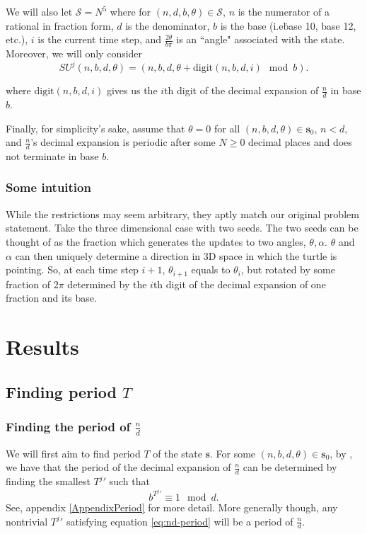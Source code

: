 \documentclass[11pt,titlepage]{article}
\newcommand{\rationalPeriod}{{T^j}'}
\begin{document}
We will also let $\mathcal{S} = N^5$ where for $(n, d, b, \theta) \in \mathcal{S}$,
$n$ is the numerator of a rational in fraction form, $d$ is the denominator, 
$b$ is the base (i.e\. base 10, base 12, etc.), $i$ is the current time step,
and $\frac{2\theta}{b \pi}$ is an ``angle" associated with the state.
Moreover, we will only consider
$$
  SU^j(n, b, d, \theta) = (n, b, d, \theta + \mathrm{digit}(n, b, d, i) \mod b).
$$

where $\mathrm{digit}(n, b, d, i)$ gives us the $i$th digit of the decimal expansion of $\frac{n}{d}$
in base $b$.

Finally, for simplicity's sake, assume that $\theta = 0$ for all $(n, b, d, \theta) \in \pmb{s}_0$,
$n < d$, and $\frac{n}{d}$'s decimal expansion is periodic after some $N \geq 0$ decimal places
and does not terminate in base $b$.

\subsubsection{Some intuition}
While the restrictions may seem arbitrary, they aptly match our original problem statement.
Take the three dimensional case with two seeds. The two seeds can be thought
of as the fraction which generates the updates to two angles, $\theta, \alpha$.
$\theta$ and $\alpha$ can then uniquely determine a direction in 3D space in which the 
turtle is pointing. 
So, at each time step $i + 1$, $\theta_{i + 1}$ equals to $\theta_i$, but rotated by
some fraction of $2 \pi$ determined by the $i$th digit of the decimal expansion of one fraction and its base.



\section{Results}
\subsection{Finding period $T$}
\subsubsection{Finding the period of $\frac{n}{d}$}
We will first aim to find period $T$ of the state $\pmb{s}$.
For some $(n, b, d, \theta) \in \pmb{s}_0$, by \cite{MathOverflowFracPeriod},
we have that the period of the decimal expansion of $\frac{n}{d}$
can be determined by finding the smallest $\rationalPeriod$ such that
\begin{equation}
\label{eq:nd-period}
b ^ {\rationalPeriod} \equiv 1 \mod d.
\end{equation}
See, appendix \ref{AppendixPeriod} for more detail.
More generally though, any nontrivial $\rationalPeriod$ satisfying equation \ref{eq:nd-period}
will be a period of $\frac{n}{d}$.
\end{document}

